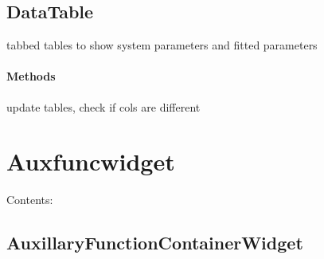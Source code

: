 \documentclass[letterpaper,10pt,english]{sphinxmanual}
\begin{document}
\subsection{DataTable}
\label{DataTable::doc}\label{DataTable:datatable}

\begin{fulllineitems}
\label{DataTable:Datatablewidget.DataTable}
tabbed tables to show system parameters and fitted parameters
\paragraph{Methods}

\begin{fulllineitems}
\label{DataTable:Datatablewidget.DataTable.update_pandas_table}
update tables, check if cols are different

\end{fulllineitems}


\end{fulllineitems}



\section{Auxfuncwidget}
\label{Auxfuncwidget::doc}\label{Auxfuncwidget:auxfuncwidget}
Contents:


\subsection{AuxillaryFunctionContainerWidget}
\label{AuxillaryFunctionContainerWidget::doc}\label{AuxillaryFunctionContainerWidget:auxillaryfunctioncontainerwidget}
\end{document}
